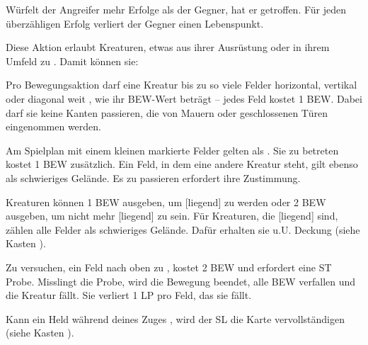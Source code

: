 {			Würfelt der Angreifer mehr Erfolge als der Gegner, hat er getroffen. Für jeden überzähligen Erfolg verliert der Gegner einen Lebenspunkt.

			Diese Aktion erlaubt Kreaturen, etwas aus ihrer Ausrüstung oder in ihrem Umfeld zu . Damit können sie:



			Pro Bewegungsaktion darf eine Kreatur bis zu so viele Felder horizontal, vertikal oder diagonal weit , wie ihr BEW-Wert beträgt -- jedes Feld kostet 1 BEW. Dabei darf sie keine Kanten passieren, die von Mauern oder geschlossenen Türen eingenommen werden.

			Am Spielplan mit einem kleinen  markierte Felder gelten als . Sie zu betreten kostet 1 BEW zusätzlich. Ein Feld, in dem eine andere Kreatur steht, gilt ebenso als schwieriges Gelände. Es zu passieren erfordert ihre Zustimmung.

			Kreaturen können 1 BEW ausgeben, um [liegend] zu werden oder 2 BEW ausgeben, um nicht mehr [liegend] zu sein. Für Kreaturen, die [liegend] sind, zählen alle Felder als schwieriges Gelände. Dafür erhalten sie u.U. Deckung (siehe Kasten ).

			Zu versuchen, ein Feld nach oben zu , kostet 2 BEW und erfordert eine ST Probe. Misslingt die Probe, wird die Bewegung beendet, alle BEW verfallen und die Kreatur fällt. Sie verliert 1 LP pro Feld, das sie fällt.

			Kann ein Held während deines Zuges , wird der SL die Karte vervollständigen (siehe Kasten ).

}
